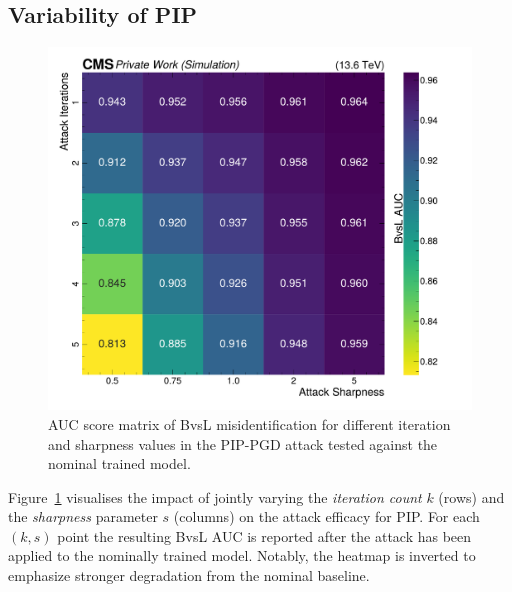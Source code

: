 \subsection{Variability of PIP}
\label{sec:intprob_variability}

\begin{figure}[h]
\centering
    \includegraphics[width=15cm]{media/output/sharpness_iterations_scan.pdf}
    \caption{AUC score matrix of BvsL misidentification for different iteration and sharpness values in the PIP-PGD attack tested against the nominal trained model.}
    \label{fig:joint_sharpness_vs_iterarions}
\end{figure}

Figure~\ref{fig:joint_sharpness_vs_iterarions} visualises the impact of jointly varying the \emph{iteration count} $k$ (rows) and the \emph{sharpness} parameter $s$ (columns) on the attack efficacy for PIP. For each $(k,s)$ point the resulting BvsL AUC is reported after the attack has been applied to the nominally trained model. Notably, the heatmap is inverted to emphasize stronger degradation from the nominal baseline.

\newpage
